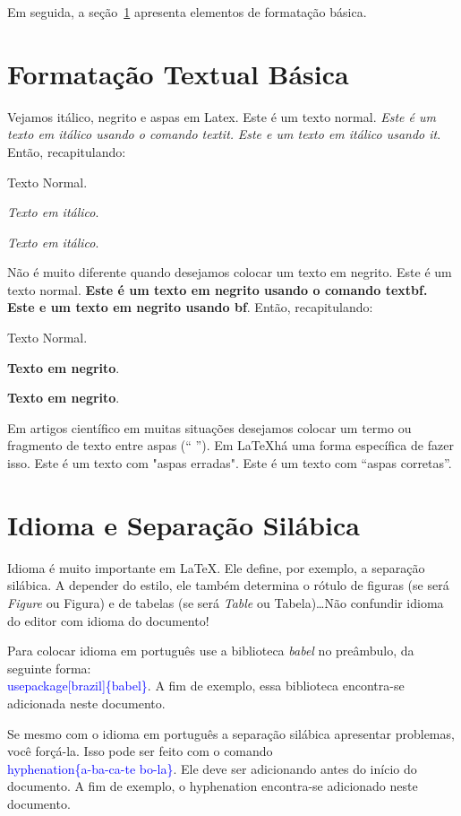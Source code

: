 \documentclass[12pt]{article}
\begin{document}
Em seguida, a seção~\ref{sec:f} apresenta elementos de formatação básica. 

\section{Formatação Textual Básica}
\label{sec:f}

Vejamos itálico, negrito e aspas em Latex. Este é um texto normal. \textit{Este é um texto em itálico usando o comando textit.} {\it Este e um texto em itálico usando it}. Então, recapitulando:

Texto Normal.

\textit{Texto em itálico}.

{\it Texto em itálico}.

Não é muito diferente quando desejamos colocar um texto em negrito. Este é um texto normal. \textbf{Este é um texto em negrito usando o comando textbf.} {\bf Este e um texto em negrito usando bf}. Então, recapitulando:

Texto Normal.

\textbf{Texto em negrito}.

{\bf Texto em negrito}.

Em artigos científico em muitas situações desejamos colocar um termo ou fragmento de texto entre aspas (`` ''). Em \LaTeX há uma forma específica de fazer isso. Este é um texto com "aspas erradas". Este é um texto com ``aspas corretas''.


\section{Idioma e Separação Silábica}

Idioma é muito importante em \LaTeX. Ele define, por exemplo, a separação silábica. A depender do estilo, ele também determina o rótulo de figuras (se será \textit{Figure} ou Figura) e de tabelas (se será \textit{Table} ou Tabela)\ldots  Não confundir idioma do editor com idioma do documento!

Para colocar idioma em português use a biblioteca \textit{babel} no preâmbulo, da seguinte forma:\textcolor{blue}{\\usepackage[brazil]\{babel\}}. A fim de exemplo, essa biblioteca encontra-se adicionada neste documento.

Se mesmo com o idioma em português a separação silábica apresentar problemas, você forçá-la. Isso pode ser feito com o comando \textcolor{blue}{\\hyphenation\{a-ba-ca-te bo-la\}}.  Ele deve ser adicionando antes do início do documento.  A fim de exemplo, o hyphenation encontra-se adicionado neste documento.
\end{document}
